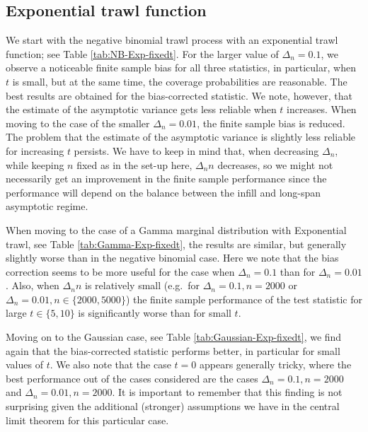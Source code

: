 \documentclass{article}
\theoremstyle{plain}
\theoremstyle{definition}
\theoremstyle{remark}
\begin{document}
\begin{appendix}
\subsection{Exponential trawl function}
We start with the negative binomial trawl process with an exponential trawl function; see
Table \ref{tab:NB-Exp-fixedt}.
For the larger value of $\Delta_n=0.1$, we observe a noticeable finite sample bias for all three statistics, in particular, when $t$ is small, but at the same time, the coverage probabilities are reasonable. The best results are obtained for the bias-corrected statistic. We note, however, that the estimate of the asymptotic variance gets less reliable when $t$ increases.
When moving to the case of the smaller $\Delta_n=0.01$, the finite sample bias is reduced. The problem that the estimate of the asymptotic variance is slightly less reliable for increasing $t$ persists. 
We have to keep in mind that, when decreasing $\Delta_n$, while keeping $n$ fixed as in the set-up here, $\Delta_n n$ decreases, so we might not necessarily get an improvement in the finite sample performance since the performance will depend on the balance between the infill and long-span asymptotic regime. 

When moving to the case of a Gamma marginal distribution with Exponential trawl, see Table 
\ref{tab:Gamma-Exp-fixedt},
the results are similar, but generally slightly worse than in the negative binomial case. 
Here we note that the bias correction seems to be more useful for the case when $\Delta_n=0.1$ than for $\Delta_n=0.01$.
Also, when $\Delta_n n$ is relatively small (e.g.~for $\Delta_n=0.1, n=2000$ or $\Delta_n=0.01, n \in \{2000, 5000\}$) the finite sample performance of the test statistic for large $t\in \{5, 10\}$ is significantly worse than for small $t$. 

Moving on to the Gaussian case, see Table 
\ref{tab:Gaussian-Exp-fixedt}, we find again that the bias-corrected statistic performs better, in particular for small values of $t$. We also note that the case $t=0$ appears generally tricky, where the best performance out of the cases considered are the cases $\Delta_n=0.1, n=2000$ and $\Delta_n=0.01, n=2000$. It is important to remember that this finding is not surprising given the additional (stronger) assumptions we have in the central limit theorem for this particular case.



\end{appendix}
\end{document}
